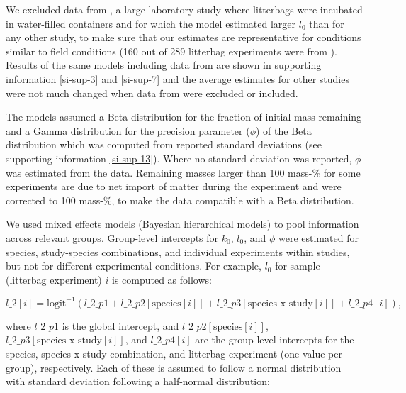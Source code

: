 \documentclass[bg, manuscript]{copernicus}
\begin{document}
We excluded data from \citet{Bengtsson.2017}, a large laboratory study where litterbags were incubated in water-filled containers and for which the model estimated larger \(l_0\) than for any other study, to make sure that our estimates are representative for conditions similar to field conditions (160 out of 289 litterbag experiments were from \citet{Bengtsson.2017}). Results of the same models including data from \citet{Bengtsson.2017} are shown in supporting information \ref{si-sup-3} and \ref{si-sup-7} and the average estimates for other studies were not much changed when data from \citet{Bengtsson.2017} were excluded or included.

The models assumed a Beta distribution for the fraction of initial mass remaining and a Gamma distribution for the precision parameter (\(\phi\)) of the Beta distribution which was computed from reported standard deviations (see supporting information \ref{si-sup-13}). Where no standard deviation was reported, \(\phi\) was estimated from the data. Remaining masses larger than 100 mass-\% for some experiments are due to net import of matter during the experiment and were corrected to 100 mass-\%, to make the data compatible with a Beta distribution.

We used mixed effects models (Bayesian hierarchical models) to pool information across relevant groups. Group-level intercepts for \(k_0\), \(l_0\), and \(\phi\) were estimated for species, study-species combinations, and individual experiments within studies, but not for different experimental conditions. For example, \(l_0\) for sample (litterbag experiment) \(i\) is computed as follows:

\begin{equation}
l\_2[i]  =  \text{logit}^{-1}(l\_2\_p1 + l\_2\_p2[\text{species}[i]] + l\_2\_p3[\text{species x study}[i]] + l\_2\_p4[i]),
\label{eq:leaching-hierarchical-model-l0}
\end{equation}

where \(l\_2\_p1\) is the global intercept, and \(l\_2\_p2[\text{species}[i]]\), \(l\_2\_p3[\text{species x study}[i]]\), and \(l\_2\_p4[i]\) are the group-level intercepts for the species, species x study combination, and litterbag experiment (one value per group), respectively. Each of these is assumed to follow a normal distribution with standard deviation following a half-normal distribution:
\end{document}
